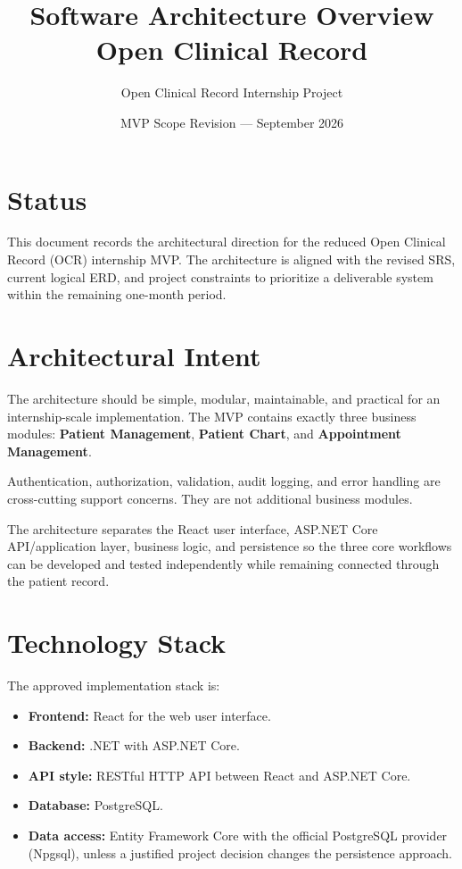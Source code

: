 \documentclass[11pt,a4paper]{article}
\title{Software Architecture Overview\\[0.4em]Open Clinical Record}
\author{Open Clinical Record Internship Project}
\date{MVP Scope Revision --- September 2026}
\begin{document}
\maketitle
\tableofcontents
\newpage

\section{Status}
This document records the architectural direction for the reduced Open Clinical Record (OCR) internship MVP. The architecture is aligned with the revised SRS, current logical ERD, and project constraints to prioritize a deliverable system within the remaining one-month period.

\section{Architectural Intent}
The architecture should be simple, modular, maintainable, and practical for an internship-scale implementation. The MVP contains exactly three business modules: \textbf{Patient Management}, \textbf{Patient Chart}, and \textbf{Appointment Management}.

Authentication, authorization, validation, audit logging, and error handling are cross-cutting support concerns. They are not additional business modules.

The architecture separates the React user interface, ASP.NET Core API/application layer, business logic, and persistence so the three core workflows can be developed and tested independently while remaining connected through the patient record.

\section{Technology Stack}
The approved implementation stack is:
\begin{itemize}
    \item \textbf{Frontend:} React for the web user interface.
    \item \textbf{Backend:} .NET with ASP.NET Core.
    \item \textbf{API style:} RESTful HTTP API between React and ASP.NET Core.
    \item \textbf{Database:} PostgreSQL.
    \item \textbf{Data access:} Entity Framework Core with the official PostgreSQL provider (Npgsql), unless a justified project decision changes the persistence approach.
\end{itemize}
\end{document}
